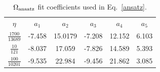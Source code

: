 \begin{table}%
 \begin{center}
  \begin{tabular}{ c c c c c c}
  \hline\hline
  $\eta$& $a_1$ & $a_2$ & $a_3$ & $a_4$ & $ a_5 $  \\  
    $\frac{1700}{13689}$& -7.458 & 15.0179 & -7.208 & 12.152 & 6.103 \\ [1ex]
   $\frac{10}{121}$& -8.037 & 17.059 & -7.826 & 14.589 & 5.393\\ [1ex]
    $\frac{100}{10201}$&-9.535 & 22.984 & -9.456 & 21.862 & 3.085 \\ [1ex]
   \hline
   \end{tabular}
   \caption{\label{coef}\(\Omega_{\rm ansatz}\) fit coefficients used in Eq.~\ref{ansatz}.}
  \end{center}
\end{table}




